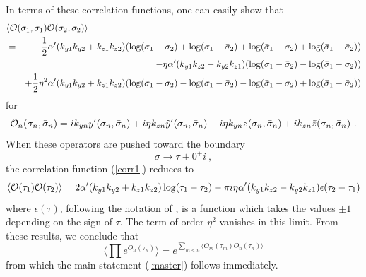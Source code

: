 \documentclass[12pt]{article}
\newcommand{\be}{\begin{equation}}
\newcommand{\ee}{\end{equation}}
\newcommand{\beq}{\begin{eqnarray}}
\newcommand{\eeq}{\end{eqnarray}}
\begin{document}
%
In terms of these correlation functions, one can easily show that
%
\beq \lefteqn{\langle {\cal O}(\sigma_1, \bar \sigma_1) {\cal
O}(\sigma_2, \bar \sigma_2) \rangle}\label{corr1} \\
& =& {1 \over 2} \alpha' (k_{y1} k_{y2} + k_{z1} k_{z2}) (\log(\sigma_1 -
\sigma_2) + \log(\sigma_1 - \bar \sigma_2) + \log(\bar \sigma_1 -
\sigma_2) + \log(\bar \sigma_1 - \bar \sigma_2)) \nonumber \cr
&& - \eta \alpha' (k_{y1} k_{z2} - k_{y2} k_{z1}) (\log(\sigma_1 -
\bar \sigma_2) -  \log(\bar \sigma_1 - \sigma_2)) \nonumber\cr
&&
+{1 \over 2}\eta^2  \alpha' (k_{y1} k_{y2} + k_{z1} k_{z2}) (\log(\sigma_1 -
\sigma_2) - \log(\sigma_1 - \bar \sigma_2) - \log(\bar \sigma_1 -
\sigma_2) + \log(\bar \sigma_1 - \bar \sigma_2)) \nonumber
\eeq
%
for 
%
\be {\cal O}_n(\sigma_n,\bar \sigma_n) = 
i k_{yn} y'(\sigma_n,\bar \sigma_n) + i \eta k_{zn} \tilde y'(\sigma_n, \bar \sigma_n)- i \eta k_{yn} z(\sigma_n,\bar \sigma_n) + i k_{zn} \tilde z (\sigma_n,\bar \sigma_n) \ . 
\ee
%
When these operators are pushed toward the boundary
%
\be \sigma \rightarrow \tau + 0^+ i \ , \ee
%
the correlation function (\ref{corr1}) reduces to
%
\be \langle {\cal O}(\tau_1) {\cal
O}(\tau_2) \rangle
 = 2 \alpha' (k_{y1} k_{y2} + k_{z1} k_{z2}) \log(\tau_1 -
\tau_2)
 -  \pi i   \eta \alpha' (k_{y1} k_{z2} - k_{y2} k_{z1}) \epsilon(\tau_2 - \tau_1) \label{OOcorr}\ee
%
where $\epsilon(\tau)$, following the notation of \cite{Seiberg:1999vs}, is a function which takes the values $\pm 1$ depending on the sign of $\tau$. The term of order $\eta^2$ vanishes in this limit.  From these
results, we conclude that
%
\be \langle \prod e^{O_n(\tau_n)} \rangle = e^{\sum_{m < n} \langle O_m(\tau_m) O_n(\tau_n) \rangle} \label{OOope}\ee
%
from which the main statement (\ref{master})  follows immediately.
\end{document}

